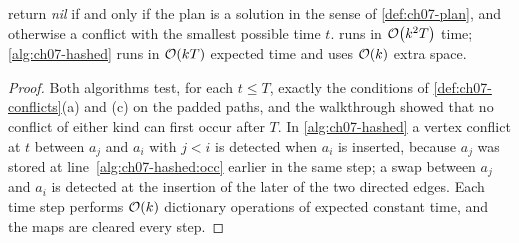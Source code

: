 \begin{algorithm}[!htb]
\caption{First conflict of a plan with hash maps}
\label{alg:ch07-hashed}
\end{algorithm}

\begin{proposition}
\label{prop:ch07-detection}
 return \emph{nil} if and only if the
plan is a solution in the sense of \cref{def:ch07-plan}, and otherwise a
conflict with the smallest possible time $t$.  runs
in $\mathcal{O}\!\left(k^2 T\right)$ time; \cref{alg:ch07-hashed} runs in $\mathcal{O}\!\left(kT\right)$ expected
time and uses $\mathcal{O}\!\left(k\right)$ extra space.
\end{proposition}
\begin{proof}
Both algorithms test, for each $t \le T$, exactly the conditions of
\cref{def:ch07-conflicts}(a) and (c) on the padded paths, and the walkthrough
showed that no conflict of either kind can first occur after $T$. In
\cref{alg:ch07-hashed} a vertex conflict at $t$ between $a_j$ and $a_i$ with
$j < i$ is detected when $a_i$ is inserted, because $a_j$ was stored at
line~\ref{alg:ch07-hashed:occ} earlier in the same step; a swap between $a_j$
and $a_i$ is detected at the insertion of the later of the two directed
edges. Each time step performs $\mathcal{O}\!\left(k\right)$ dictionary operations of expected
constant time, and the maps are cleared every step.
\end{proof}

